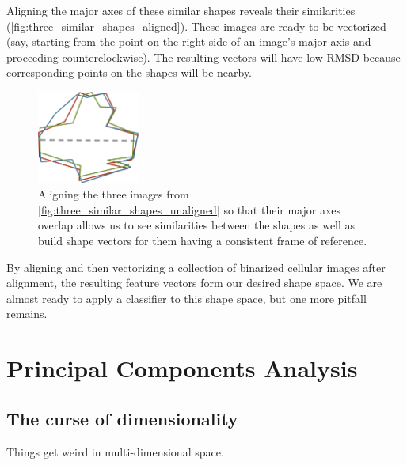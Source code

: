 Aligning the major axes of these similar shapes reveals their similarities (\autoref{fig:three_similar_shapes_aligned}). These images are ready to be vectorized (say, starting from the point on the right side of an image's major axis and proceeding counterclockwise). The resulting vectors will have low RMSD because corresponding points on the shapes will be nearby.\\

\begin{figure}[h]
\centering
\mySfFamily
\includegraphics[width = 0.3\textwidth]{../images/three_similar_shapes_aligned.png}
\caption{Aligning the three images from \autoref{fig:three_similar_shapes_unaligned} so that their major axes overlap allows us to see similarities between the shapes as well as build shape vectors for them having a consistent frame of reference.}
\label{fig:three_similar_shapes_aligned}
\end{figure}

\begin{note}\end{note}

By aligning and then vectorizing a collection of binarized cellular images after alignment, the resulting feature vectors form our desired shape space. We are almost ready to apply a classifier to this shape space, but one more pitfall remains.\\


\FloatBarrier
{}

\section{Principal Components Analysis}
\label{sec:pca}

\subsection{The curse of dimensionality}

Things get weird in multi-dimensional space.

